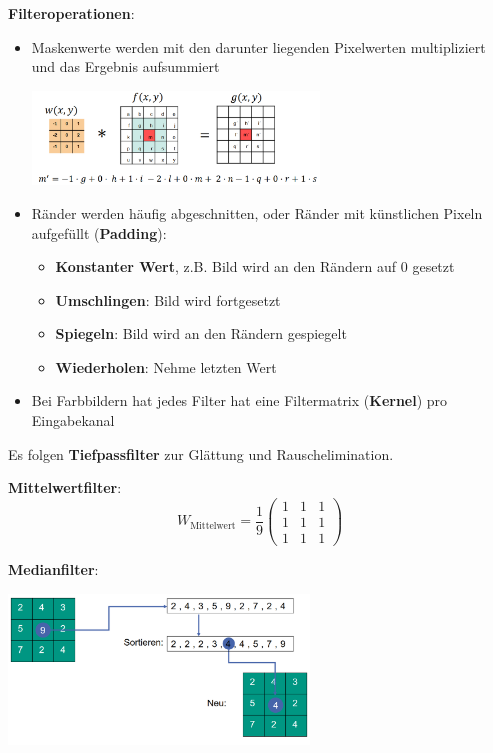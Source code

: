 \bigskip
\textbf{Filteroperationen}:
\begin{itemize}
	\item Maskenwerte werden mit den darunter liegenden Pixelwerten multipliziert und das Ergebnis aufsummiert 
	\begin{center}
		\includegraphics[width=0.6\textwidth]{images/filter.png}
	\end{center}
	\item Ränder werden häufig abgeschnitten, oder Ränder mit künstlichen Pixeln aufgefüllt (\textbf{Padding}):
	\begin{itemize}
		\item \textbf{Konstanter Wert}, z.B. Bild wird an den Rändern auf 0 gesetzt
		\item \textbf{Umschlingen}: Bild wird fortgesetzt
		\item \textbf{Spiegeln}: Bild wird an den Rändern gespiegelt
		\item \textbf{Wiederholen}: Nehme letzten Wert
	\end{itemize}
	\item Bei Farbbildern hat jedes Filter hat eine Filtermatrix (\textbf{Kernel}) pro Eingabekanal
\end{itemize}
\bigskip
Es folgen \textbf{Tiefpassfilter} zur Glättung und Rauschelimination.

\textbf{Mittelwertfilter}:
$$W_\text{Mittelwert}=\frac{1}{9}\left(
\begin{matrix}
	1 & 1 & 1 \\
	1 & 1 & 1 \\
	1 & 1 & 1 
\end{matrix}\right)$$
\pagebreak

\textbf{Medianfilter}:
\begin{center}
	\includegraphics[width=0.6\textwidth]{images/median.png}
\end{center}

